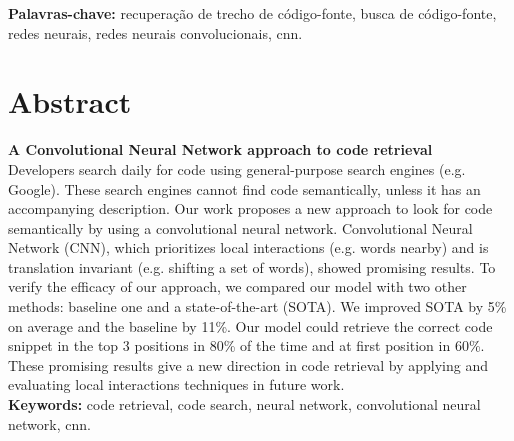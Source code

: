 \documentclass[12pt,twoside,a4paper]{book} %
\begin{document}
\noindent \textbf{Palavras-chave:} recuperação de trecho de código-fonte, busca de código-fonte, redes neurais, redes neurais convolucionais, cnn.

\chapter*{Abstract}
\noindent \textbf{A Convolutional Neural Network approach to code retrieval}
\\

Developers search daily for code using general-purpose search engines (e.g. Google). These search engines cannot find code semantically, unless it has an accompanying description. Our work proposes a new approach to look for code semantically by using a convolutional neural network. Convolutional Neural Network (CNN), which prioritizes local interactions (e.g. words nearby) and is translation invariant (e.g. shifting a set of words), showed promising results. To verify the efficacy of our approach, we compared our model with two other methods: baseline one and a state-of-the-art (SOTA). We improved SOTA by 5\% on average and the baseline by 11\%. Our model could retrieve the correct code snippet in the top 3 positions in 80\% of the time and at first position in 60\%. These promising results give a new direction in code retrieval by applying and evaluating local interactions techniques in future work.
\\

\noindent \textbf{Keywords:} code retrieval, code search, neural network, convolutional neural network, cnn.

\tableofcontents    %


\end{document}
